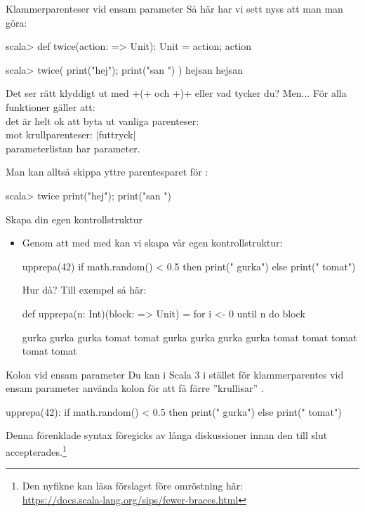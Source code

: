 \begin{Slide}{Klammerparenteser vid ensam parameter}
Så här har vi sett nyss att man man göra:
\begin{REPL}
scala> def twice(action: => Unit): Unit = { action; action }

scala> twice( { print("hej"); print("san ") } )
hejsan hejsan
\end{REPL}

Det ser rätt klyddigt ut med \code+({+  och \code+})+ eller vad tycker du? \pause Men...
För alla funktioner  gäller att: \\ det är helt ok att byta ut vanliga parenteser: \hfill{} \\ mot krullparenteser: \hfill\code|f{uttryck}| \\  parameterlistan har  parameter.

\vspace{0.5em}Man kan alltså skippa yttre parentesparet för :
\begin{REPLnonum}
scala> twice { print("hej"); print("san ") }
\end{REPLnonum}
\end{Slide}



\begin{Slide}{Skapa din egen kontrollstruktur}\SlideFontSmall
\begin{itemize}
\item Genom att   med  med  kan vi skapa vår egen kontrollstruktur:  \pause
\begin{Code}
upprepa(42){
  if math.random() < 0.5 then print(" gurka")
  else print(" tomat")
}
\end{Code}
Hur då?
\pause
 Till exempel så här:
\begin{Code}
def upprepa(n: Int)(block: => Unit) = for i <- 0 until n do block
\end{Code}

\pause

\begin{REPLnonum}
gurka gurka gurka tomat tomat gurka gurka gurka gurka tomat tomat tomat tomat tomat
\end{REPLnonum}
\end{itemize}
\end{Slide}


\begin{Slide}{Kolon vid ensam parameter}\SlideFontSmall
Du kan i Scala 3 i stället för klammerparentes vid ensam parameter använda kolon för att få färre ''krullisar'' .
\begin{Code}
  upprepa(42):
    if math.random() < 0.5 
    then print(" gurka")
    else print(" tomat")
\end{Code}
Denna förenklade syntax föregicks av långa diskussioner innan den till slut accepterades.\footnote{
Den nyfikne kan läsa förslaget före omröstning här: \\ \url{https://docs.scala-lang.org/sips/fewer-braces.html}}
\end{Slide}

